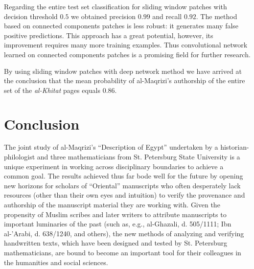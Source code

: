 \documentclass[conference,a4paper,twocolumn]{IEEEtran}
\begin{document}
\begin{figure}
\begin{minipage}{.48\linewidth}
\end{minipage}
	\label{fig:al_maqrizi_classification_example}
\end{figure}

Regarding the entire test set classification for sliding window patches with decision threshold $0.5$ we obtained precision $0.99$ and recall $0.92$. The method based on connected components patches is less robust: it generates many false positive predictions. This approach has a great potential, however, its improvement requires many more training examples. Thus convolutional network learned on connected components patches is a promising field for further research.

By using sliding window patches with deep network method we have arrived at the conclusion that the mean probability of al-Maqrizi's authorship  of the entire set of the {\it al-Khitat} pages equals $0.86$.    

\section{Conclusion}

The joint study of al-Maqrizi's ``Description of Egypt'' undertaken by a historian-philologist and three mathematicians from St. Petersburg State University is a unique experiment in working across disciplinary boundaries to achieve a common goal. The results achieved thus far bode well for the future by opening new horizons for scholars of ``Oriental'' manuscripts who often desperately lack resources (other than their own eyes and intuition) to verify the provenance and authorship of the manuscript material they are working with. Given the propensity of Muslim scribes and later writers to attribute manuscripts to important luminaries of the past (such as, e.g., al-Ghazali, d. 505/1111; Ibn al-'Arabi, d. 638/1240, and others), the new methods of analyzing and verifying handwritten texts, which have been designed and tested by St. Petersburg mathematicians, are bound to become an important tool for their colleagues in the humanities and social sciences.
\end{document}
